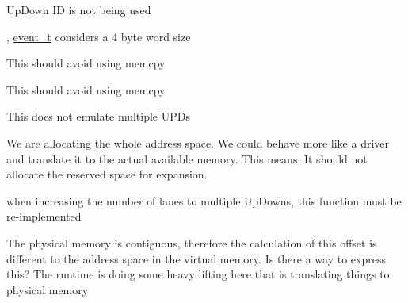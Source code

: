
\begin{DoxyRefList}
\item[Class \mbox{\hyperlink{class_up_down_1_1event__t}{Up\+Down\+::event\+\_\+t}} ]\label{todo__todo000001}%
%
Up\+Down ID is not being used 



, \mbox{\hyperlink{class_up_down_1_1event__t}{event\+\_\+t}} considers a 4 byte word size  
\item[Member \mbox{\hyperlink{class_up_down_1_1operands__t_ab85237b737f780d3985be56eec5067ff}{Up\+Down\+::operands\+\_\+t\+::operands\+\_\+t}} (uint8\+\_\+t num, ptr\+\_\+t oper, word\+\_\+t cont=0)]\label{todo__todo000002}%
%
This should avoid using memcpy  
\item[Member \mbox{\hyperlink{class_up_down_1_1operands__t_a90604b735bc17d1136cbd32da1292496}{Up\+Down\+::operands\+\_\+t\+::operands\+\_\+t}} (uint8\+\_\+t num, word\+\_\+t cont=0)]\label{todo__todo000003}%
%
This should avoid using memcpy  
\item[Class \mbox{\hyperlink{class_up_down_1_1_sim_u_d_runtime__t}{Up\+Down\+::Sim\+UDRuntime\+\_\+t}} ]\label{todo__todo000006}%
%
This does not emulate multiple UPDs 
\item[Member \mbox{\hyperlink{class_up_down_1_1_sim_u_d_runtime__t_a7113c0fad105b40a81231139332c0061}{Up\+Down\+::Sim\+UDRuntime\+\_\+t\+::init\+Memory\+Arrays}} ()]\label{todo__todo000007}%
%
We are allocating the whole address space. We could behave more like a driver and translate it to the actual available memory. This means. It should not allocate the reserved space for expansion.  
\item[Member \mbox{\hyperlink{class_up_down_1_1_sim_u_d_runtime__t_a76423ee519101241d96a212a307d9d8e}{Up\+Down\+::Sim\+UDRuntime\+\_\+t\+::init\+Python\+Interface}} (Emulator\+Log\+Level print\+Level)]\label{todo__todo000008}%
%
when increasing the number of lanes to multiple Up\+Downs, this function must be re-\/implemented  
\item[Member \mbox{\hyperlink{class_up_down_1_1_sim_u_d_runtime__t_a811c0050b3d1ce0e696bddb853017972}{Up\+Down\+::Sim\+UDRuntime\+\_\+t\+::t2ud\+\_\+memcpy}} (void $\ast$data, uint64\+\_\+t size, uint8\+\_\+t ud\+\_\+id, uint8\+\_\+t lane\+\_\+num, uint32\+\_\+t offset)]\label{todo__todo000009}%
%
The physical memory is contiguous, therefore the calculation of this offset is different to the address space in the virtual memory. Is there a way to express this? The runtime is doing some heavy lifting here that is translating things to physical memory  

\end{DoxyRefList}
